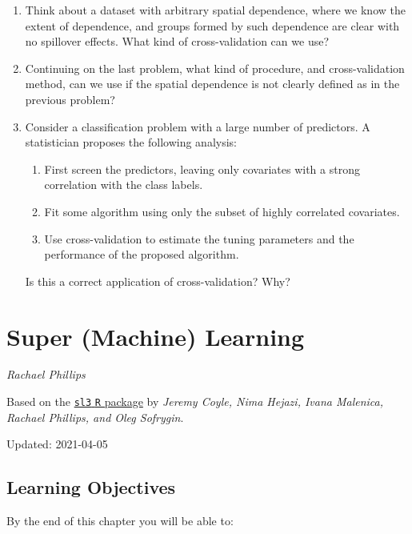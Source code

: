 \documentclass[12pt, krantz2,]{krantz}
\providecommand{\tightlist}{%
  \setlength{\itemsep}{0pt}\setlength{\parskip}{0pt}}
\theoremstyle{definition}
\theoremstyle{definition}
\theoremstyle{definition}
\newcommand{\1}{\mathbbm{1}}
\begin{document}
\begin{enumerate}
\def\labelenumi{\arabic{enumi}.}
\item
  Think about a dataset with arbitrary spatial dependence, where we know
  the extent of dependence, and groups formed by such dependence are clear
  with no spillover effects. What kind of cross-validation can we use?
\item
  Continuing on the last problem, what kind of procedure, and cross-validation
  method, can we use if the spatial dependence is not clearly defined as in the
  previous problem?
\item
  Consider a classification problem with a large number of predictors. A
  statistician proposes the following analysis:

  \begin{enumerate}
  \def\labelenumii{\alph{enumii}.}
  \tightlist
  \item
    First screen the predictors, leaving only covariates with a strong
    correlation with the class labels.
  \item
    Fit some algorithm using only the subset of highly correlated covariates.
  \item
    Use cross-validation to estimate the tuning parameters and the performance
    of the proposed algorithm.
  \end{enumerate}

  Is this a correct application of cross-validation? Why?
\end{enumerate}

\hypertarget{sl3}{%
\section{Super (Machine) Learning}\label{sl3}}

\emph{Rachael Phillips}

Based on the \href{https://github.com/tlverse/sl3}{\texttt{sl3} \texttt{R} package} by \emph{Jeremy
Coyle, Nima Hejazi, Ivana Malenica, Rachael Phillips, and Oleg Sofrygin}.

Updated: 2021-04-05

\hypertarget{learning-objectives-3}{%
\subsection*{Learning Objectives}\label{learning-objectives-3}}


By the end of this chapter you will be able to:
\end{document}
